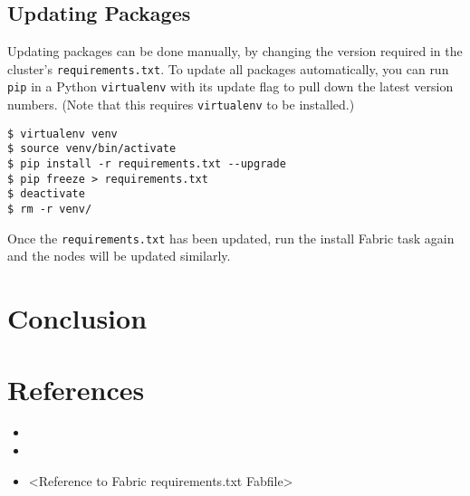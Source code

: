 \documentclass[9pt,twocolumn,twoside]{idsi}
\begin{document}
\subsection{Updating Packages}
Updating packages can be done manually, by changing the version required in the cluster's \texttt{requirements.txt}. To update all packages automatically, you can run \texttt{pip} in a Python \texttt{virtualenv} with its update flag to pull down the latest version numbers. (Note that this requires \texttt{virtualenv} to be installed.)

\begin{verbatim}
$ virtualenv venv
$ source venv/bin/activate
$ pip install -r requirements.txt --upgrade
$ pip freeze > requirements.txt
$ deactivate
$ rm -r venv/
\end{verbatim}

Once the \texttt{requirements.txt} has been updated, run the install Fabric task again and the nodes will be updated similarly.

\section{Conclusion}  

\section*{References}
\begin{itemize}
  \item <Reference to Fabric setup technical report>
  \item <Reference to Python3 install fabfile>
  \item <Reference to Fabric requirements.txt Fabfile>
\end{itemize}
\end{document}

